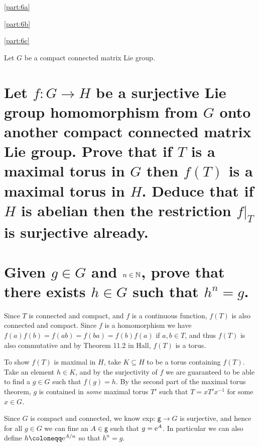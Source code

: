 \documentclass[
	pages,
	boxes,
	color=WildStrawberry
]{homework}
\begin{document}
\begin{solution}
	\ref{part:6a}

	\ref{part:6b}

	\ref{part:6c}
\end{solution}

\begin{problem}
Let $G$ be a compact connected matrix Lie group.
\begin{parts}
	\part{Let $f: G \to H$ be a surjective Lie group homomorphism from $G$ onto another compact connected matrix Lie group. Prove that if $T$ is a maximal torus in $G$ then $f(T)$ is a maximal torus in $H$. Deduce that if $H$ is abelian then the restriction $f|_{T}$ is surjective already.}\label{part:8a}
	\part{Given $g \in G$ and $n \in \mathbb{N}$, prove that there exists $h \in G$ such that $h^n = g$.}\label{part:8b}
\end{parts}
\end{problem}

\begin{solution}
	\ref{part:8a}
	Since $T$ is connected and compact, and $f$ is a continuous function, $f(T)$ is also connected and compact. Since $f$ is a homomorphism we have $f(a)f(b) = f(ab) = f(ba) = f(b)f(a)$ if $a, b\in T$, and thus $f(T)$ is also commutative and by Theorem 11.2 in Hall, $f(T)$ is a torus.

	To show $f(T)$ is maximal in $H$, take $K\subseteq H$ to be a torus containing $f(T)$. Take an element $h\in K$, and by the surjectivity of $f$ we are guaranteed to be able to find a $g\in G$ such that $f(g) = h$. By the second part of the maximal torus theorem, $g$ is contained in \emph{some} maximal torus $T'$ such that $T = xT'x^{-1}$ for some $x\in G$.

	\ref{part:8b}
	Since $G$ is compact and connected, we know exp: $\mathsf{g}\to G$ is surjective, and hence for all $g\in G$ we can fine an $A\in\mathsf{g}$ such that $g = \mathrm{e}^{A}$. In particular we can also define $h\defeq \e^{A/n}$ so that $h^n = g$.
\end{solution}
\end{document}
